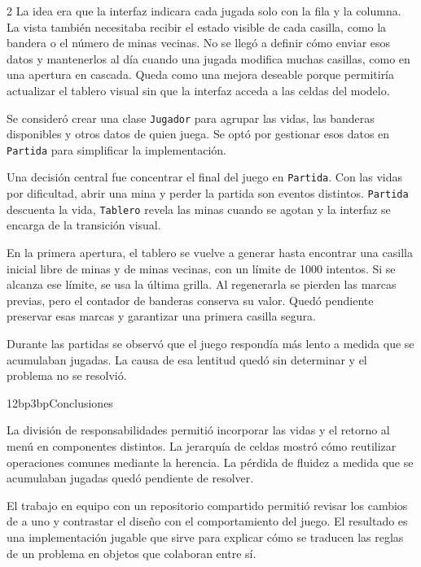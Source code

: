\documentclass[a4paper,10pt]{article}
\makeatletter
\renewcommand{\section}{\@startsection{section}{1}{0pt}
  {12bp}{3bp}{\normalfont\fontsize{10bp}{12bp}\selectfont\bfseries}}
\makeatother
\begin{document}
\begin{multicols}{2}
La idea era que la interfaz indicara cada jugada solo con la fila y la columna. La vista también necesitaba recibir el estado visible de cada casilla, como la bandera o el número de minas vecinas. No se llegó a definir cómo enviar esos datos y mantenerlos al día cuando una jugada modifica muchas casillas, como en una apertura en cascada. Queda como una mejora deseable porque permitiría actualizar el tablero visual sin que la interfaz acceda a las celdas del modelo.

Se consideró crear una clase \texttt{Jugador} para agrupar las vidas, las banderas disponibles y otros datos de quien juega. Se optó por gestionar esos datos en \texttt{Partida} para simplificar la implementación.

Una decisión central fue concentrar el final del juego en \texttt{Partida}. Con las vidas por dificultad, abrir una mina y perder la partida son eventos distintos. \texttt{Partida} descuenta la vida, \texttt{Tablero} revela las minas cuando se agotan y la interfaz se encarga de la transición visual.

En la primera apertura, el tablero se vuelve a generar hasta encontrar una casilla inicial libre de minas y de minas vecinas, con un límite de 1000 intentos. Si se alcanza ese límite, se usa la última grilla. Al regenerarla se pierden las marcas previas, pero el contador de banderas conserva su valor. Quedó pendiente preservar esas marcas y garantizar una primera casilla segura.

Durante las partidas se observó que el juego respondía más lento a medida que se acumulaban jugadas. La causa de esa lentitud quedó sin determinar y el problema no se resolvió.

\section{Conclusiones}

La división de responsabilidades permitió incorporar las vidas y el retorno al menú en componentes distintos. La jerarquía de celdas mostró cómo reutilizar operaciones comunes mediante la herencia. La pérdida de fluidez a medida que se acumulaban jugadas quedó pendiente de resolver.

El trabajo en equipo con un repositorio compartido permitió revisar los cambios de a uno y contrastar el diseño con el comportamiento del juego. El resultado es una implementación jugable que sirve para explicar cómo se traducen las reglas de un problema en objetos que colaboran entre sí.


\end{multicols}
\end{document}
